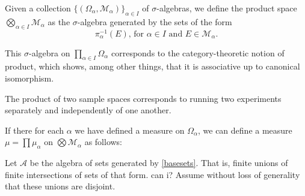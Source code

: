 \documentclass{article}
\theoremstyle{definition}
\newcommand{\M}{\mathcal{M}}
\newcommand{\A}{\mathcal{A}}
\begin{document}
	Given a collection $\{(\Omega_\alpha, \M_\alpha)\}_{\alpha \in I}$ of $\sigma$-algebras, we define the product space $\bigotimes_{\alpha\in I} \M_\alpha$ as the $\sigma$-algebra generated by the sets of the form
	\begin{equation}\label{basesets}
	\pi_\alpha^{-1}(E)\text{, for $\alpha \in I$ and $E \in \M_\alpha$}.
	\end{equation}
	
	This $\sigma$-algebra on $\prod_{\alpha \in I} \Omega_\alpha$ corresponds to the category-theoretic notion of product, which shows, among other things, that it is associative up to canonical isomorphism.
	
	The product of two sample spaces corresponds to running two experiments separately and independently of one another.
	
	If there for each $\alpha$ we have defined a measure on $\Omega_\alpha$, we can define a measure $\mu = \prod \mu_\alpha$ on $\bigotimes \M_\alpha$ as follows:
	
	Let $\A$ be the algebra of sets generated by \eqref{basesets}. That is, finite unions of finite intersections of sets of that form. can i? Assume without loss of generality that these unions are disjoint.
\end{document}
